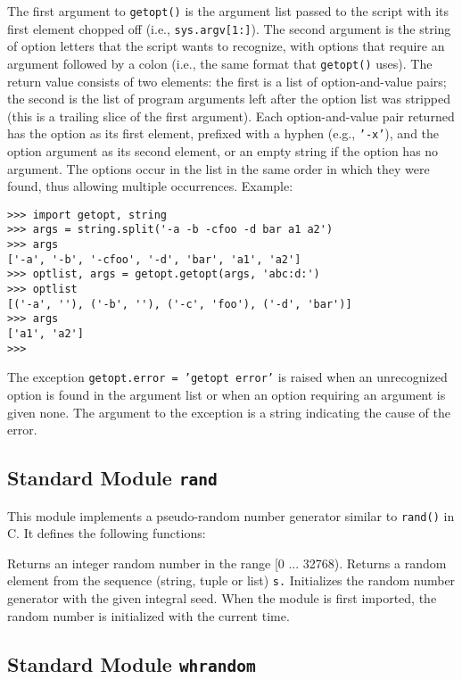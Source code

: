 The first argument to
{\tt getopt()}
is the argument list passed to the script with its first element
chopped off (i.e.,
{\tt sys.argv[1:]}).
The second argument is the string of option letters that the
script wants to recognize, with options that require an argument
followed by a colon (i.e., the same format that {\UNIX}
{\tt getopt()}
uses).
The return value consists of two elements: the first is a list of
option-and-value pairs; the second is the list of program arguments
left after the option list was stripped (this is a trailing slice of the
first argument).
Each option-and-value pair returned has the option as its first element,
prefixed with a hyphen (e.g.,
{\tt '-x'}),
and the option argument as its second element, or an empty string if the
option has no argument.
The options occur in the list in the same order in which they were
found, thus allowing multiple occurrences.
Example:
\bcode\begin{verbatim}
>>> import getopt, string
>>> args = string.split('-a -b -cfoo -d bar a1 a2')
>>> args
['-a', '-b', '-cfoo', '-d', 'bar', 'a1', 'a2']
>>> optlist, args = getopt.getopt(args, 'abc:d:')
>>> optlist
[('-a', ''), ('-b', ''), ('-c', 'foo'), ('-d', 'bar')]
>>> args
['a1', 'a2']
>>> 
\end{verbatim}\ecode
The exception
{\tt getopt.error = 'getopt error'}
is raised when an unrecognized option is found in the argument list or
when an option requiring an argument is given none.
The argument to the exception is a string indicating the cause of the
error.

\subsection{Standard Module {\tt rand}}

This module implements a pseudo-random number generator similar to
{\tt rand()}
in C.
It defines the following functions:
\begin{description}
Returns an integer random number in the range [0 ... 32768).
Returns a random element from the sequence (string, tuple or list)
{\tt s.}
Initializes the random number generator with the given integral seed.
When the module is first imported, the random number is initialized with
the current time.
\end{description}

\subsection{Standard Module {\tt whrandom}}


